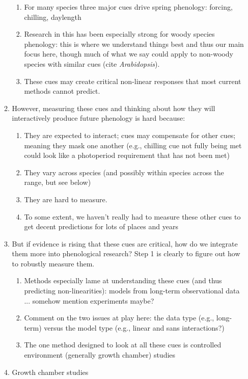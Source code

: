\documentclass[11pt,letterpaper]{article}
\begin{document}
\begin{enumerate}
\begin{enumerate}
\begin{enumerate}
\item For many species three major cues drive spring phenology: forcing, chilling, daylength
\item Research in this has been especially strong for woody species phenology: this is where we understand things best and thus our main focus here, though much of what we say could apply to non-woody species with similar cues (cite \emph{Arabidopsis}).
\item These cues may create critical non-linear responses that most current methods cannot predict.
\end{enumerate}
\item However, measuring these cues and thinking about how they will interactively produce future phenology is hard because:
\begin{enumerate}
\item They are expected to interact; cues may compensate for other cues; meaning they mask one another (e.g., chilling cue not fully being met could look like a photoperiod requirement that has not been met)
\item They vary across species (and possibly within species across the range, but see below)
\item They are hard to measure.
\item To some extent, we haven't really had to measure these other cues to get decent predictions for lots of places and years
\end{enumerate}
\item But if evidence is rising that these cues are critical, how do we integrate them more into phenological research? Step 1 is clearly to figure out how to robustly measure them. 
\begin{enumerate}
\item Methods especially lame at understanding these cues (and thus predicting non-linearities): models from long-term observational data ... somehow mention experiments maybe?
\item Comment on the two issues at play here: the data type (e.g., long-term) versus the model type (e.g., linear and sans interactions?)
\item The one method designed to look at all these cues is controlled environment (generally growth chamber) studies
\end{enumerate}
\item Growth chamber studies

\end{enumerate}
\end{enumerate}
\end{document}

